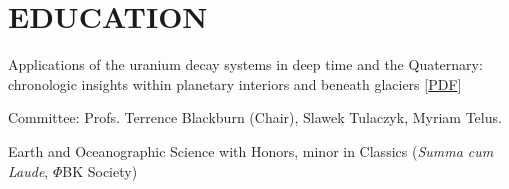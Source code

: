 \section*{EDUCATION}

Applications of the uranium decay systems in deep time and the Quaternary: chronologic insights within planetary interiors and beneath glaciers [\href{https://escholarship.org/uc/item/0vp7r59z}{PDF}]

\quad Committee: Profs. Terrence Blackburn (Chair), Slawek Tulaczyk, Myriam Telus.

Earth and Oceanographic Science with Honors, minor in Classics (\emph{Summa cum Laude}, $\Phi$BK Society)